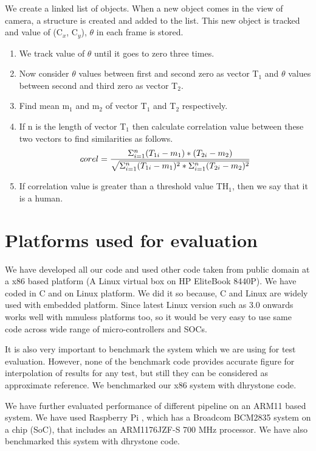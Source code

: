 \begin{enumerate}
\indent We create a linked list of objects. When a new object comes in
the view of camera, a structure is created and added to the list. This
new object is tracked and value of (C$_x$, C$_y$), $\theta$ in each
frame is stored.
\begin{enumerate} 
\item We track value of $\theta$ until it goes to zero three times.
\item Now consider $\theta$ values between first and second zero as
vector T$_1$ and $\theta$ values between second and third zero as vector
T$_2$.
\item Find mean m$_1$ and m$_2$ of vector T$_1$ and T$_2$ respectively.
\item If n is the length of vector T$_1$ then calculate correlation value
between these two vectors to find similarities as follows.
	\begin{equation}
	corel = {{\Sigma ^n _{i = 1}(T_{1i} - m_1) * (T_{2i} - m_2)}
\over {\sqrt {\Sigma ^n _{i = 1} (T_{1i} - m_1)^2 * \Sigma ^n _{i = 1} (T_{2i}
- m_2)^2}}}
	\end{equation}
\item If correlation value is greater than a threshold value TH$_1$, then we say
that it is a human.
\end{enumerate} 

\end{enumerate} 


\section {Platforms used for evaluation}

\indent We have developed all our code and used other code taken from
public domain at a x86 based platform (A Linux virtual box on HP
EliteBook 8440P). We have coded in C and on Linux platform. We did it so
because, C and Linux are widely used with embedded platform. Since
latest Linux version such as 3.0 onwards works well with mmuless
platforms too, so it would be very easy to use same code across wide
range of micro-controllers and SOCs.

\indent It is also very important to benchmark the system which we are
using for test evaluation. However, none of the benchmark code provides
accurate figure for interpolation of results for any test, but still
they can be considered as approximate reference. We benchmarked our x86
system with dhrystone code.

\indent We have further evaluated performance of different pipeline on
an ARM11 based system. We have used Raspberry Pi , which has a Broadcom
BCM2835 system on a chip (SoC), that includes an ARM1176JZF-S 700 MHz
processor. We have also benchmarked this system with dhrystone code.
